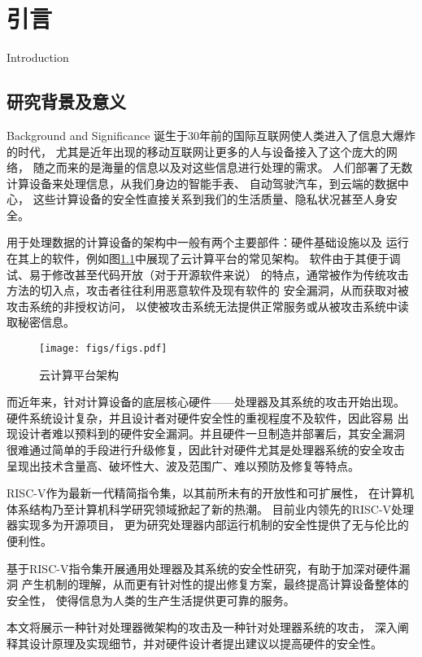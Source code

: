 
\chapter{引言}{Introduction}


\section{研究背景及意义}{Background and Significance}
诞生于30年前的国际互联网使人类进入了信息大爆炸的时代，
尤其是近年出现的移动互联网让更多的人与设备接入了这个庞大的网络，
随之而来的是海量的信息以及对这些信息进行处理的需求。
人们部署了无数计算设备来处理信息，从我们身边的智能手表、
自动驾驶汽车，到云端的数据中心，
这些计算设备的安全性直接关系到我们的生活质量、隐私状况甚至人身安全。

用于处理数据的计算设备的架构中一般有两个主要部件：硬件基础设施以及
运行在其上的软件，例如图\ref{fig:cloud-arch}中展现了云计算平台的常见架构。
软件由于其便于调试、易于修改甚至代码开放（对于开源软件来说）
的特点，通常被作为传统攻击方法的切入点，攻击者往往利用恶意软件及现有软件的
安全漏洞，从而获取对被攻击系统的非授权访问，
以使被攻击系统无法提供正常服务或从被攻击系统中读取秘密信息。\cite{sw_attack}

\begin{figure}[ht]
	\centering
	\texttt{[image: figs/figs.pdf]}
	\caption{云计算平台架构}
	\label{fig:cloud-arch}
\end{figure}

而近年来，针对计算设备的底层核心硬件——处理器及其系统的攻击开始出现。
硬件系统设计复杂，并且设计者对硬件安全性的重视程度不及软件，因此容易
出现设计者难以预料到的硬件安全漏洞。并且硬件一旦制造并部署后，其安全漏洞
很难通过简单的手段进行升级修复，因此针对硬件尤其是处理器系统的安全攻击
呈现出技术含量高、破坏性大、波及范围广、难以预防及修复等特点。

RISC-V作为最新一代精简指令集，以其前所未有的开放性和可扩展性，
在计算机体系结构乃至计算机科学研究领域掀起了新的热潮。
目前业内领先的RISC-V处理器实现多为开源项目，
更为研究处理器内部运行机制的安全性提供了无与伦比的便利性。

基于RISC-V指令集开展通用处理器及其系统的安全性研究，有助于加深对硬件漏洞
产生机制的理解，从而更有针对性的提出修复方案，最终提高计算设备整体的安全性，
使得信息为人类的生产生活提供更可靠的服务。

本文将展示一种针对处理器微架构的攻击及一种针对处理器系统的攻击，
深入阐释其设计原理及实现细节，并对硬件设计者提出建议以提高硬件的安全性。


